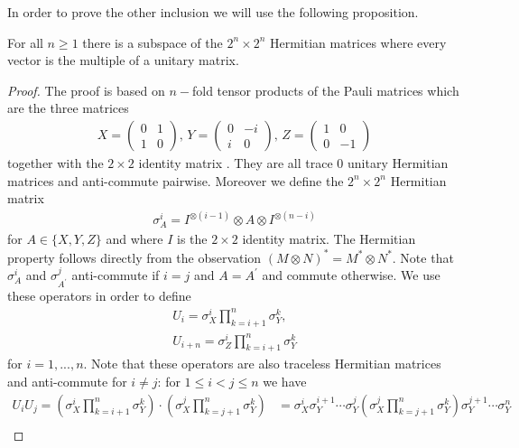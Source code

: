 In order to prove the other inclusion we will use the following proposition. 
\begin{prop} \label{PauliProp}
	For all $ n \ge 1 $ there is a subspace of the $ 2^n \times 2^n $ Hermitian matrices where every vector is the multiple of a unitary matrix. 
\end{prop}
	\begin{proof}
		The proof is based on $ n- $fold tensor products of the Pauli matrices which are the three matrices 
		\begin{align*}
		X = \begin{pmatrix}
		0 & 1 \\ 1 & 0
		\end{pmatrix}, \, Y = \begin{pmatrix}
		0 & -i \\ i & 0
		\end{pmatrix}, \, Z = \begin{pmatrix}
		1 & 0 \\ 0 & -1
		\end{pmatrix}
		\end{align*}
		together with the $ 2 \times 2 $ identity matrix .
		They are all trace $ 0 $ unitary Hermitian matrices and anti-commute pairwise. 
		Moreover we define the $ 2^n \times 2^n $ Hermitian matrix 
		\begin{align*}
		\sigma_A^i = I^{\otimes (i-1)} \otimes A \otimes I^{\otimes (n-i)}
		\end{align*}
		for $ A \in \{ X,Y,Z \}$ and where $ I $ is the $ 2 \times 2 $ identity matrix. The Hermitian property follows directly from the observation $ (M \otimes N)^* = M^* \otimes N^* $.
		Note that $ \sigma_A^i $ and $ \sigma_{A^{'}}^j $ anti-commute if $ i = j $ and $ A = A^{'} $ and commute otherwise. We use these operators in order to define 
		\begin{align*}
		U_i = \sigma_X^i \prod_{k = i+1}^{n}\sigma_Y^k,  \\
		U_{i+n} = \sigma_Z^i \prod_{k = i+1}^n \sigma_Y^k
		\end{align*}
		for $ i = 1,...,n $. Note that these operators are also traceless Hermitian matrices and anti-commute for $ i \neq j $:    
		for $ 1 \le i < j  \le n$ we have 
		\begin{align*}
		U_iU_j = (\sigma_X^i \prod_{k = i+1}^{n}\sigma_Y^k) \cdot( \sigma_X^j \prod_{k = j+1}^{n}\sigma_Y^k) &= \sigma_X^i \sigma_Y^{i+1} \cdots \sigma_Y^j ( \sigma_X^j \prod_{k = j+1}^{n}\sigma_Y^k) \sigma_Y^{j+1} \cdots \sigma_Y^n \\

\end{align*}
\end{proof}
